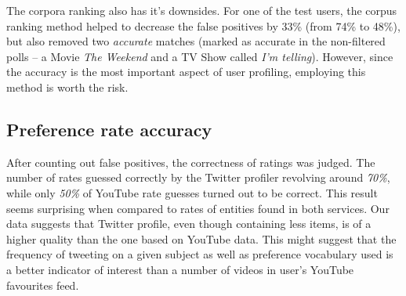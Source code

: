The corpora ranking also has it's downsides. For one of the test users, the corpus ranking method helped to
decrease the false positives by 33\% (from 74\% to 48\%), but also removed two \textit{accurate} matches (marked as
accurate in the non-filtered polls -- a Movie \textit{The Weekend} and a TV Show called \textit{I'm telling}).
However, since the accuracy is the most important aspect of user profiling, employing this method is worth
the risk.

\subsection{Preference rate accuracy}
After counting out false positives, the correctness of ratings was judged. The
number of rates guessed correctly by the Twitter profiler revolving around \textit{70\%},
while only \textit{50\%} of YouTube rate guesses turned out to be correct. This
result seems surprising when compared to rates of entities found in both
services. Our data suggests that Twitter profile, even though containing less
items, is of a higher quality than the one based on YouTube data.  This
might suggest that the frequency of tweeting on a given subject as well as
preference vocabulary used is a better indicator of interest than a number of
videos in user's YouTube favourites feed.
